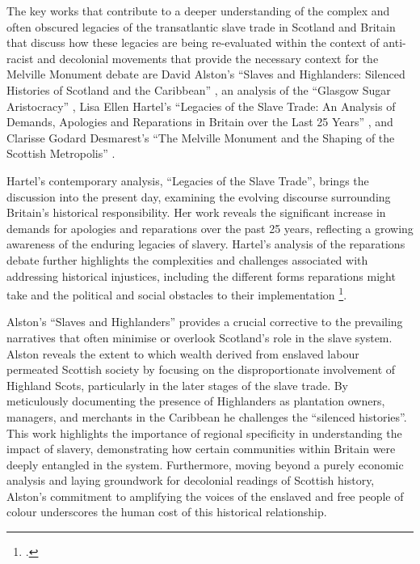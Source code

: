 \documentclass{scrartcl}
\renewcommand{\cite}{\parencite}
\begin{document}
The  key works that contribute to a deeper understanding of the complex and often obscured legacies of the transatlantic slave trade in Scotland and Britain that discuss  how these legacies are being re-evaluated within the context of anti-racist and decolonial movements that provide the necessary context for the Melville Monument debate are David Alston's ``Slaves and Highlanders: Silenced Histories of Scotland and the Caribbean'' \cite{alston_2021}, an analysis of the ``Glasgow Sugar Aristocracy'' \cite{mullen_2022} , Lisa Ellen Hartel's ``Legacies of the Slave Trade: An Analysis of Demands, Apologies and Reparations in Britain over the Last 25 Years'' \cite{hartel_2024} , and Clarisse Godard Desmarest's ``The Melville Monument and the Shaping of the Scottish Metropolis'' \cite{godard_2018}.

Hartel's contemporary analysis, ``Legacies of the Slave Trade'', brings the discussion into the present day, examining the evolving discourse surrounding Britain's historical responsibility.
Her work reveals the significant increase in demands for apologies and reparations over the past 25 years, reflecting a growing awareness of the enduring legacies of slavery.
Hartel's analysis of the reparations debate further highlights the complexities and challenges associated with addressing historical injustices, including the different forms reparations might take and the political and social obstacles to their implementation \footcite[``All three of these trends are connected to a change in narratives and the issue of apologizing becoming more important within Britain itself, helped by social media campaigns''][p.9]{hartel_2024}.

Alston's ``Slaves and Highlanders'' provides a crucial corrective to the prevailing narratives that often minimise or overlook Scotland's role in the slave system. 
Alston reveals the extent to which wealth derived from enslaved labour permeated Scottish society by focusing on the disproportionate involvement of Highland Scots, particularly in the later stages of the slave trade.
By meticulously documenting the presence of Highlanders as plantation owners, managers, and merchants in the Caribbean he challenges the ``silenced histories''.
This work highlights the importance of regional specificity in understanding the impact of slavery, demonstrating how certain communities within Britain were deeply entangled in the system.
Furthermore, moving beyond a purely economic analysis and laying groundwork for decolonial readings of Scottish history, Alston's commitment to amplifying the voices of the enslaved and free people of colour underscores the human cost of this historical relationship.
\end{document}
